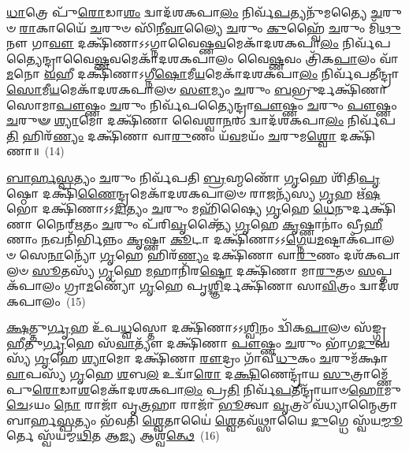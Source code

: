 {\anuvakamend[{𑌤𑍇\-\ul{𑌭𑍍𑌯𑌃} 𑌪𑌞𑍍𑌚᳴𑌚𑌤𑍍𑌵𑌾𑌰𑌿𑍞𑌶𑌚𑍍𑌚}]}%

\-\ul{𑌧𑌾}\-𑌤𑍍𑌰𑍇 𑌪𑍁᳴\-\ul{𑌰𑍋}\-𑌡𑌾\-\ul{𑌶𑌂} 𑌦𑍍𑌵𑌾𑌦᳴𑌶\-𑌕𑌪𑌾\-\ul{𑌲𑌂} 𑌨𑌿𑌰𑍍𑌵᳴\-\ul{𑌪}\-𑌤𑍍𑌯𑌨𑍁᳴𑌮𑌤𑍍𑌯𑍈 \ul{𑌚}\-𑌰𑍁𑍞 \ul{𑌰𑌾}\-𑌕𑌾𑌯𑍈᳴ \ul{𑌚}\-𑌰𑍁𑍞 𑌸𑌿᳴𑌨𑍀\-\ul{𑌵𑌾}\-𑌲𑍍𑌯𑍈 \ul{𑌚}\-𑌰𑍁𑌂 \ul{𑌕𑍁}\-𑌹𑍍𑌵𑍈᳴ \ul{𑌚}\-𑌰𑍁𑌂 𑌮𑌿᳴\-\ul{𑌥𑍁}\-𑌨𑍗 𑌗𑌾\-\ul{𑌵𑍗} 𑌦𑌕𑍍𑌷𑌿᳴𑌣𑌾\-𑌽\-𑌽𑌗𑍍𑌨𑌾𑌵𑍈𑌷𑍍𑌣\-\ul{𑌵}\-𑌮𑍇𑌕𑌾᳴\-𑌦𑌶\-𑌕𑌪𑌾\-\ul{𑌲𑌂} 𑌨𑌿𑌰𑍍𑌵᳴𑌪𑌤𑍍𑌯𑍈𑌨𑍍𑌦𑍍𑌰𑌾𑌵𑍈\-\ul{𑌷𑍍𑌣}\-𑌵𑌮𑍇𑌕𑌾᳴\-𑌦𑌶\-𑌕𑌪𑌾𑌲𑌂 𑌵𑍈\-\ul{𑌷𑍍𑌣}\-𑌵𑌂 𑌤𑍍𑌰𑌿᳴𑌕\-\ul{𑌪𑌾}\-𑌲𑌂 𑌵𑌾᳴\-\ul{𑌮}\-𑌨𑍋 \ul{𑌵}\-𑌹𑍀 𑌦𑌕𑍍𑌷𑌿᳴𑌣𑌾\-𑌽𑌗𑍍𑌨𑍀\-\ul{𑌷𑍋}\-𑌮𑍀\-\ul{𑌯}\-𑌮𑍇𑌕𑌾᳴\-𑌦𑌶\-𑌕𑌪𑌾\-\ul{𑌲𑌂} 𑌨𑌿𑌰𑍍𑌵᳴𑌪𑌤𑍀𑌨𑍍𑌦𑍍𑌰𑌾\-\-\ul{𑌸𑍋}\-𑌮𑍀\-\ul{𑌯}\-\-𑌮𑍇𑌕𑌾᳴\-𑌦𑌶\-𑌕𑌪𑌾𑌲𑍞 \ul{𑌸𑍗}\-𑌮𑍍𑌯𑌂 \ul{𑌚}\-𑌰𑍁𑌂 \ul{𑌬}\-𑌭𑍍𑌰𑍁𑌰𑍍𑌦𑌕𑍍𑌷𑌿᳴𑌣𑌾 𑌸𑍋𑌮𑌾\-\ul{𑌪𑍗}\-𑌷𑍍𑌣𑌂 \ul{𑌚}\-𑌰𑍁𑌂 𑌨𑌿𑌰𑍍𑌵᳴𑌪𑌤𑍍𑌯𑍈𑌨𑍍𑌦𑍍𑌰𑌾\-\ul{𑌪𑍗}\-𑌷𑍍𑌣𑌂 \ul{𑌚}\-𑌰𑍁𑌂 \ul{𑌪𑍗}\-𑌷𑍍𑌣𑌂 \ul{𑌚}\-𑌰𑍁𑍟 \ul{𑌶𑍍𑌯𑌾}\-𑌮𑍋 𑌦𑌕𑍍𑌷𑌿᳴𑌣𑌾 𑌵𑍈𑌶𑍍𑌵𑌾\-\ul{𑌨}\-𑌰𑌂 𑌦𑍍𑌵𑌾𑌦᳴𑌶\-𑌕𑌪𑌾\-\ul{𑌲𑌂} 𑌨𑌿𑌰𑍍𑌵᳴𑌪\-\ul{𑌤𑌿} 𑌹𑌿𑌰᳴\-\ul{𑌣𑍍𑌯𑌂} 𑌦𑌕𑍍𑌷𑌿᳴𑌣𑌾 𑌵𑌾\-\ul{𑌰𑍁}\-𑌣𑌂 𑌯᳴\-\ul{𑌵}\-𑌮𑌯𑌂᳴ \ul{𑌚}\-𑌰𑍁𑌮\-\ul{𑌶𑍍𑌵𑍋} 𑌦𑌕𑍍𑌷𑌿᳴𑌣𑌾॥~(14)

{\anuvakamend[{𑌨𑌿\-\ul{𑌰}\-𑌷𑍍𑌟𑍗 𑌚}]}%

\-\ul{𑌬𑌾}\-\-\ul{𑌰𑍍}\-\mbox{}\-\ul{𑌹}\-\-\ul{𑌸𑍍𑌪}\-𑌤𑍍𑌯𑌂 \ul{𑌚}\-𑌰𑍁𑌂 𑌨𑌿𑌰𑍍𑌵᳴𑌪𑌤𑌿 \ul{𑌬𑍍𑌰}\-𑌹𑍍𑌮𑌣𑍋᳴ \ul{𑌗𑍃}\-𑌹𑍇 𑌶𑌿᳴𑌤𑌿\-\ul{𑌪𑍃}\-𑌷𑍍𑌠𑍋 𑌦𑌕𑍍𑌷𑌿᳴\-\ul{𑌣𑍈}\-𑌨𑍍𑌦𑍍𑌰𑌮𑍇𑌕𑌾᳴\-𑌦𑌶\-𑌕𑌪𑌾𑌲𑍞 𑌰𑌾\-\ul{𑌜}\-𑌨𑍍𑌯᳴𑌸𑍍𑌯 \ul{𑌗𑍃}\-𑌹 𑌋᳴\-\ul{𑌷}\-𑌭𑍋 𑌦𑌕𑍍𑌷𑌿᳴𑌣𑌾\-𑌽\-𑌽\-\ul{𑌦𑌿}\-𑌤𑍍𑌯𑌂 \ul{𑌚}\-𑌰𑍁𑌂 𑌮𑌹𑌿᳴𑌷𑍍𑌯𑍈 \ul{𑌗𑍃}\-𑌹𑍇 \ul{𑌧𑍇}\-𑌨𑍁𑌰𑍍𑌦𑌕𑍍𑌷𑌿᳴𑌣𑌾 𑌨𑍈𑌰𑍍\mbox{}\-\ul{𑌋}\-𑌤𑌂 \ul{𑌚}\-𑌰𑍁𑌂 𑌪᳴𑌰𑌿\-\ul{𑌵𑍃}\-𑌕𑍍𑌤𑍍𑌯𑍈᳴ \ul{𑌗𑍃}\-𑌹𑍇 \ul{𑌕𑍃}\-𑌷𑍍𑌣𑌾𑌨𑌾𑌂॑ 𑌵𑍍𑌰𑍀\-\ul{𑌹𑍀}\-𑌣𑌾𑌂 \ul{𑌨}\-𑌖𑌨𑌿᳴𑌰𑍍𑌭𑌿𑌨𑍍𑌨𑌂 \ul{𑌕𑍃}\-𑌷𑍍𑌣𑌾 \ul{𑌕𑍂}\-𑌟𑌾 𑌦𑌕𑍍𑌷𑌿᳴𑌣𑌾\-𑌽\-𑌽\-\ul{𑌗𑍍𑌨𑍇}\-𑌯\-\ul{𑌮}\-𑌷𑍍𑌟𑌾𑌕᳴𑌪𑌾𑌲𑍞 𑌸𑍇\-\ul{𑌨𑌾}\-𑌨𑍍𑌯𑍋᳴ \ul{𑌗𑍃}\-𑌹𑍇 𑌹𑌿𑌰᳴\-\ul{𑌣𑍍𑌯𑌂} 𑌦𑌕𑍍𑌷𑌿᳴𑌣𑌾 𑌵𑌾\-\ul{𑌰𑍁}\-𑌣𑌂 𑌦𑌶᳴\-𑌕𑌪𑌾𑌲𑍞 \ul{𑌸𑍂}\-𑌤𑌸𑍍𑌯᳴ \ul{𑌗𑍃}\-𑌹𑍇 \ul{𑌮}\-𑌹𑌾𑌨𑌿᳴𑌰\-\ul{𑌷𑍍𑌟𑍋} 𑌦𑌕𑍍𑌷𑌿᳴𑌣𑌾 𑌮𑌾\-\ul{𑌰𑍁}\-𑌤𑍞 \ul{𑌸}\-𑌪𑍍𑌤𑌕᳴𑌪𑌾𑌲𑌂 𑌗𑍍𑌰𑌾\-\ul{𑌮}\-𑌣𑍍𑌯𑍋᳴ \ul{𑌗𑍃}\-𑌹𑍇 𑌪𑍃\-\ul{𑌶𑍍𑌞𑌿}\-𑌰𑍍𑌦𑌕𑍍𑌷𑌿᳴𑌣𑌾 𑌸𑌾\-\ul{𑌵𑌿}\-𑌤𑍍𑌰𑌂 𑌦𑍍𑌵𑌾𑌦᳴𑌶\-𑌕𑌪𑌾𑌲𑌂~(15)

\-\ul{𑌕𑍍𑌷}\-𑌤𑍍𑌤𑍁\-\ul{𑌰𑍍𑌗𑍃}\-𑌹 𑌉᳴𑌪\-\ul{𑌧𑍍𑌵}\-𑌸𑍍𑌤𑍋 𑌦𑌕𑍍𑌷𑌿᳴𑌣𑌾\-𑌽\-𑌽\-\ul{𑌶𑍍𑌵𑌿}\-𑌨𑌂 𑌦𑍍𑌵𑌿᳴𑌕\-\ul{𑌪𑌾}\-𑌲𑍞 𑌸᳴𑌙𑍍𑌗𑍍𑌰\-\ul{𑌹𑍀}\-𑌤𑍁\-\ul{𑌰𑍍𑌗𑍃}\-𑌹𑍇 𑌸᳴\-\ul{𑌵𑌾}\-𑌤𑍍𑌯𑍗᳴ 𑌦𑌕𑍍𑌷𑌿᳴𑌣𑌾 \ul{𑌪𑍗}\-𑌷𑍍𑌣𑌂 \ul{𑌚}\-𑌰𑍁𑌂 𑌭𑌾᳴𑌗\-\ul{𑌦𑍁}\-𑌘𑌸𑍍𑌯᳴ \ul{𑌗𑍃}\-𑌹𑍇 \ul{𑌶𑍍𑌯𑌾}\-𑌮𑍋 𑌦𑌕𑍍𑌷𑌿᳴𑌣𑌾 \ul{𑌰𑍗}\-𑌦𑍍𑌰𑌂 𑌗𑌾᳴𑌵𑍀\-\ul{𑌧𑍁}\-𑌕𑌂 \ul{𑌚}\-𑌰𑍁𑌮᳴𑌕𑍍𑌷𑌾\-\ul{𑌵𑌾}\-𑌪𑌸𑍍𑌯᳴ \ul{𑌗𑍃}\-𑌹𑍇 \ul{𑌶}\-𑌬\-\ul{𑌲} 𑌉𑌦𑍍𑌵𑌾᳴\-\ul{𑌰𑍋} 𑌦\-\ul{𑌕𑍍𑌷𑌿}\-𑌣𑍇𑌨𑍍𑌦𑍍𑌰𑌾᳴𑌯 \ul{𑌸𑍁}\-𑌤𑍍𑌰𑌾𑌮𑍍𑌣𑍇᳴ 𑌪𑍁\-\ul{𑌰𑍋}\-𑌡𑌾\-\ul{𑌶}\-𑌮𑍇𑌕𑌾᳴\-𑌦𑌶\-𑌕𑌪𑌾\-\ul{𑌲𑌂} 𑌪𑍍𑌰\-\ul{𑌤𑌿} 𑌨𑌿𑌰𑍍𑌵᳴\-\ul{𑌪}\-𑌤𑍀𑌨𑍍𑌦𑍍𑌰𑌾᳴𑌯𑌾𑍞\-\ul{𑌹𑍋}\-𑌮𑍁\-\ul{𑌚𑍇}\-\-𑌽𑌯𑌂 \ul{𑌨𑍋} 𑌰𑌾𑌜𑌾᳴ 𑌵𑍃\-\ul{𑌤𑍍𑌰}\-𑌹𑌾 𑌰𑌾𑌜𑌾᳴ \ul{𑌭𑍂}\-𑌤𑍍𑌵𑌾 \ul{𑌵𑍃}\-𑌤𑍍𑌰𑌂 𑌵᳴𑌧𑍍𑌯𑌾𑌨𑍍𑌮𑍈𑌤𑍍𑌰𑌾𑌬𑌾𑌰𑍍\mbox{}𑌹\-\ul{𑌸𑍍𑌪}\-𑌤𑍍𑌯𑌂 𑌭᳴𑌵𑌤𑌿 \ul{𑌶𑍍𑌵𑍇}\-𑌤𑌾𑌯𑍈॑ \ul{𑌶𑍍𑌵𑍇}\-𑌤𑌵᳴𑌥𑍍𑌸𑌾𑌯𑍈 \ul{𑌦𑍁}\-𑌗𑍍𑌧𑍇 𑌸𑍍𑌵᳴𑌯\-\ul{𑌮𑍍𑌮𑍂}\-𑌰𑍍𑌤𑍇 𑌸𑍍𑌵᳴𑌯𑌮𑍍𑌮\-\ul{𑌥𑌿}\-𑌤 𑌆\-\ul{𑌜𑍍𑌯} 𑌆𑌶𑍍𑌵᳴\-\ul{𑌤𑍍𑌥𑍇}\-~(16)

